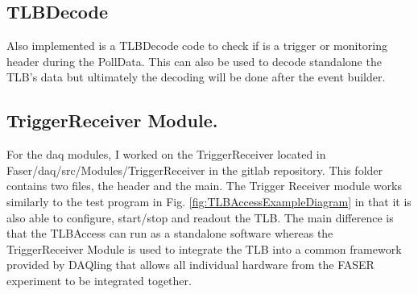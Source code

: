\subsection{TLBDecode}

Also implemented is a TLBDecode code to check if is a trigger or monitoring header during the PollData. This can also be used to decode standalone the TLB's data but ultimately the decoding will be done after the event builder.

\subsection{TriggerReceiver Module.}
\label{TriggerReceiverModule}

For the daq modules, I worked on the TriggerReceiver located in Faser/daq/src/Modules/TriggerReceiver in the gitlab repository. This folder contains two files, the header and the main. The Trigger Receiver module works similarly to the test program in Fig. \ref{fig:TLBAccessExampleDiagram} in that it is also able to configure, start/stop and readout the TLB. The main difference is that the TLBAccess can run as a standalone software whereas the TriggerReceiver Module is used to integrate the TLB into a common framework provided by DAQling that allows all individual hardware from the FASER experiment to be integrated together.